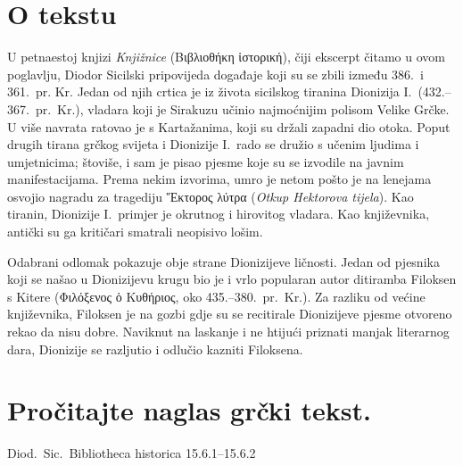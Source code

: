 


\section*{O tekstu}

U petnaestoj knjizi \textit{Knjižnice} \textgreek[variant=ancient]{(Βιβλιοθήκη ἱστορική),} čiji ekscerpt čitamo u ovom poglavlju, Diodor Sicilski pripovijeda događaje koji su se zbili između 386.\ i 361.\ pr. Kr. Jedan od njih crtica je iz života sicilskog tiranina Dionizija I.\ (432.–367.\ pr.~Kr.), vladara koji je Sirakuzu učinio najmoćnijim polisom Velike Grčke. U više navrata ratovao je s Kartažanima, koji su držali zapadni dio otoka. Poput drugih tirana grčkog svijeta i Dionizije I.\ rado se družio s učenim ljudima i umjetnicima; štoviše, i sam je pisao pjesme koje su se izvodile na javnim manifestacijama. Prema nekim izvorima, umro je netom pošto je na lenejama osvojio nagradu za tragediju \textgreek[variant=ancient]{Ἕκτορος λύτρα} (\textit{Otkup Hektorova tijela}). Kao tiranin, Dionizije I.\ primjer je okrutnog i hirovitog vladara. Kao književnika, antički su ga kritičari smatrali neopisivo lošim.
 
Odabrani odlomak pokazuje obje strane Dionizijeve ličnosti. Jedan od pjesnika koji se našao u Dionizijevu krugu bio je i vrlo popularan autor ditiramba Filoksen s Kitere (\textgreek[variant=ancient]{Φιλόξενος ὁ Κυθήριος,} oko 435.–380.\ pr.~Kr.). Za razliku od većine književnika, Filoksen je na gozbi gdje su se recitirale Dionizijeve pjesme otvoreno rekao da nisu dobre. Naviknut na laskanje i ne htijući priznati manjak literarnog dara, Dionizije se razljutio i odlučio kazniti Filoksena.

\newpage

\section*{Pročitajte naglas grčki tekst.}

Diod.~Sic.\ Bibliotheca historica 15.6.1–15.6.2


\medskip


